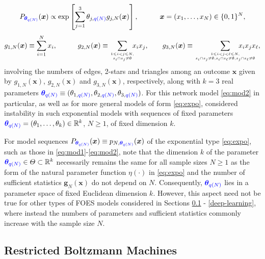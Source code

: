 \documentclass[numbib]{imamat}
\theoremstyle{theorem}
\theoremstyle{lemma}
\theoremstyle{example}
\theoremstyle{corollary}
\theoremstyle{definition}
\theoremstyle{remark}
\theoremstyle{approximation}
\theoremstyle{scheme}
\newcommand{\thetaidx}{q(N)}
\newcommand{\thetaN}{\boldsymbol \theta_{\thetaidx}}
\newcommand{\ak}[1]{{\color{blue} #1}}
\begin{document}
\begin{equation}
\label{eq:mod2}
P_{\ak{\thetaN}}(\boldsymbol x) \propto
 \exp\left[\sum_{j=1}^3 \theta_{j,\ak{\thetaidx}} g_{j,N}(\boldsymbol x)\right], \quad\qquad \boldsymbol x=(x_1,\ldots,x_N)  \in\{0,1\}^N,
\end{equation}
\[
  g_{1,N}(\boldsymbol x) \equiv \sum_{i=1}^N  x_i, \qquad\quad g_{2,N}(\boldsymbol x) \equiv \sum_{1 \leq i<j \leq N,\atop s_i \cap s_j \neq \emptyset}\!\!\!   x_i x_j, \qquad
  g_{3,N}(\boldsymbol x) \equiv \sum_{1 \leq i<j<\ell \leq N, \atop s_i \cap s_j \neq \emptyset,s_i \cap s_\ell \neq \emptyset, \\ s_j \cap s_\ell \neq \emptyset } \!\!\!\!\!\!\!\!  \!\!\!\!\!\!\!\!   x_i x_j x_\ell,
\]
involving the numbers of edges, 2-stars and triangles among an outcome \(\boldsymbol x\) given by \(g_{1,N}(\boldsymbol x)\), \(g_{2,N}(\boldsymbol x)\) and \(g_{3,N}(\boldsymbol x)\), respectively, along with \(k=3\) real parameters \(\ak{\thetaN} \equiv (\theta_{1,\ak{\thetaidx}},\theta_{2,\ak{\thetaidx}},\theta_{3,\ak{\thetaidx}})\). For this network model \eqref{eq:mod2} in particular, as well as for more general models of form \eqref{eq:expo}, \citet{schweinberger2011instability} considered instability in such exponential models with sequences of fixed parameters \(\ak{\thetaN} = (\theta_1,\ldots,\theta_k)\in\mathbb{R}^k\), \(N \geq 1\), of fixed dimension \(k\).

For model sequences \(P_{\ak{\thetaN}}(\boldsymbol x)\equiv p_{N,\ak{\thetaN}}(\boldsymbol x)\) of the exponential type \eqref{eq:expo}, such as those in \eqref{eq:mod1}-\eqref{eq:mod2}, note that the dimension \(k\) of the parameter \(\ak{\thetaN}\in\Theta \subset \mathbb{R}^k\) necessarily remains the same for all sample sizes \(N \geq 1\) as the form of the natural parameter function \(\eta(\cdot)\) in \eqref{eq:expo} and the number of sufficient statistics \(\boldsymbol g_{N}(\boldsymbol x)\) do not depend on \(N\). Consequently, \(\ak{\thetaN}\) lies in a parameter space of fixed Euclidean dimension \(k\). However, this aspect need not be true for other types of FOES models considered in Sections \ref{rbm} - \ref{deep-learning}, where instead the numbers of parameters and sufficient statistics commonly increase with the sample size \(N\).

\hypertarget{rbm}{%
\subsection{Restricted Boltzmann Machines}\label{rbm}}
\end{document}
